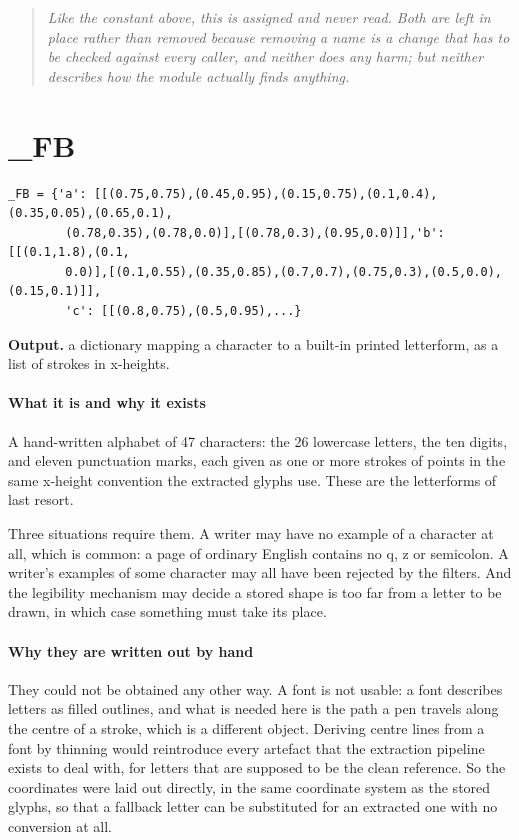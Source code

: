 \begin{quote}\small\itshape Like the constant above, this is assigned and never read. Both are left in place rather than removed because removing a name is a change that has to be checked against every caller, and neither does any harm; but neither describes how the module actually finds anything.\end{quote}

\section{\_FB}
\begin{lstlisting}[style=sig]
_FB = {'a': [[(0.75,0.75),(0.45,0.95),(0.15,0.75),(0.1,0.4),(0.35,0.05),(0.65,0.1),
        (0.78,0.35),(0.78,0.0)],[(0.78,0.3),(0.95,0.0)]],'b': [[(0.1,1.8),(0.1,
        0.0)],[(0.1,0.55),(0.35,0.85),(0.7,0.7),(0.75,0.3),(0.5,0.0),(0.15,0.1)]],
        'c': [[(0.8,0.75),(0.5,0.95),...}
\end{lstlisting}

\noindent\textbf{Output.} a dictionary mapping a character to a built-in printed letterform, as a list of strokes in x-heights.


\paragraph{What it is and why it exists}
A hand-written alphabet of 47 characters: the 26 lowercase letters, the ten digits, and eleven punctuation marks, each given as one or more strokes of points in the same x-height convention the extracted glyphs use. These are the letterforms of last resort.

Three situations require them. A writer may have no example of a character at all, which is common: a page of ordinary English contains no q, z or semicolon. A writer's examples of some character may all have been rejected by the filters. And the legibility mechanism may decide a stored shape is too far from a letter to be drawn, in which case something must take its place.


\paragraph{Why they are written out by hand}
They could not be obtained any other way. A font is not usable: a font describes letters as filled outlines, and what is needed here is the path a pen travels along the centre of a stroke, which is a different object. Deriving centre lines from a font by thinning would reintroduce every artefact that the extraction pipeline exists to deal with, for letters that are supposed to be the clean reference. So the coordinates were laid out directly, in the same coordinate system as the stored glyphs, so that a fallback letter can be substituted for an extracted one with no conversion at all.


